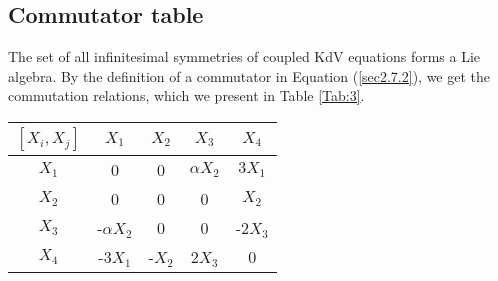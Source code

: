  \subsection{Commutator table}
 The set of all infinitesimal symmetries of coupled KdV equations forms a Lie algebra. By the definition of a commutator in Equation (\ref{sec2.7.2}), we get the commutation relations, which we present in Table \ref{Tab:3}.
 \begin{center}
 	
 	\begin{tabular}{|c |c|c|c|c|} 
 		\hline 
 		$[X_i,X_j]$	& $ X_1$ & $ X_2$ & $ X_3$ & $ X_4$ \\ 
 		\hline 
 		$ X_1$ & 0 & 0 & $\alpha X_2$ & $ 3X_1$ \\ 
 		\hline 
 		$ X_2$ & 0 & 0 & 0 & $ X_2$ \\ 
 		\hline 
 		$ X_3$ & -$\alpha X_2$ & 0 & 0 & -2$X_3$\\ 
 		\hline 
 		$ X_4$ & -3$X_1$ & -$ X_2$ &2$X_3$  & 0 \\ 
 		\hline 
 	\end{tabular}
 \end{center}
